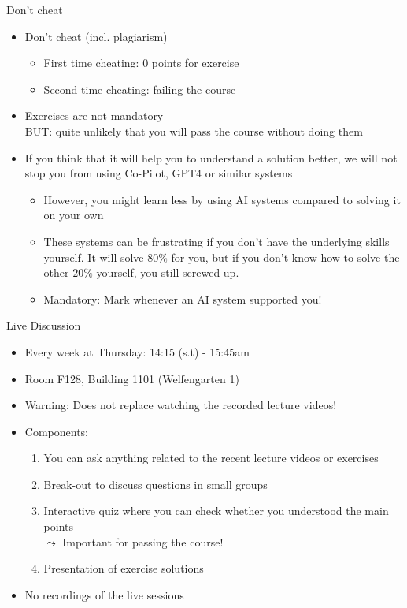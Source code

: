 \documentclass[aspectratio=169, handout]{../latex_main/tntbeamer}  %
\begin{document}
\begin{frame}[c]{Don't cheat}

\begin{itemize}
  \item Don't cheat (incl. plagiarism)
  \begin{itemize}
    \item First time cheating: $0$ points for exercise
    \item Second time cheating: failing the course
  \end{itemize}
  \pause
  \item Exercises are not mandatory\\ \alert{BUT: quite unlikely that you will pass the course without doing them}
  \medskip
  \item If you think that it will help you to understand a solution better, we will not stop you from using Co-Pilot, GPT4 or similar systems
  \begin{itemize}
      \item However, you might learn less by using AI systems compared to solving it on your own
      \item These systems can be frustrating if you don't have the underlying skills yourself. It will solve $80\%$ for you, but if you don't know how to solve the other $20\%$ yourself, you still screwed up.
      \item \alert{Mandatory:} Mark whenever an AI system supported you!
  \end{itemize}
\end{itemize}

\end{frame}
\begin{frame}[c]{Live Discussion}

\begin{itemize}
  \item Every week at Thursday: 14:15 (s.t) - 15:45am\\ 
  \item Room F128, Building 1101 (Welfengarten 1)
  \pause
  \item Warning: Does not replace watching the recorded lecture videos!
  \pause
  \smallskip
  \item Components:
  \begin{enumerate}
       \item You can ask anything related to the recent lecture videos or exercises
      \item Break-out to discuss questions in small groups 
      \item \alert{Interactive quiz} where you can check whether you understood the main points\\ $\leadsto$ \alert{Important for passing the course!}
      \pause
      \item Presentation of exercise solutions
  \end{enumerate}
  \pause
  \medskip
  \item No recordings of the live sessions
\end{itemize}

\end{frame}
\end{document}

